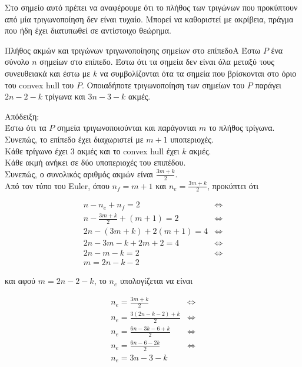 \documentclass[oneside,12pt]{book}
\theoremstyle{definition}
\begin{document}
Στο σημείο αυτό πρέπει να αναφέρουμε ότι το πλήθος των τριγώνων που προκύπτουν από μία τριγωνοποίηση δεν είναι τυχαίο. Μπορεί να καθοριστεί με ακρίβεια, πράγμα που ήδη έχει διατυπωθεί σε αντίστοιχο θεώρημα. \\

\begin{mytheorem}{Πλήθος ακμών και τριγώνων τριγωνοποίησης σημείων στο επίπεδο}{Α}
	Έστω \(P\) ένα σύνολο \(n\) σημείων στο επίπεδο. Έστω ότι τα σημεία δεν είναι όλα μεταξύ τους συνευθειακά και έστω με \(k\) να συμβολίζονται ότα τα σημεία που βρίσκονται στο όριο του convex hull του \(P\). Οποιαδήποτε τριγωνοποίηση των σημείων του \(P\) παράγει \(2n - 2 - k \) τρίγωνα και \(3n - 3 - k\) ακμές.
\end{mytheorem}

Απόδειξη: \\
Έστω ότι τα \(P\) σημεία τριγωνοποιούνται και παράγονται \(m\) το πλήθος τρίγωνα. Συνεπώς, το επίπεδο έχει διαχωριστεί με \(m + 1\) υποπεριοχές. \\
Κάθε τρίγωνο έχει 3 ακμές και το convex hull έχει \(k\) ακμές. \\
Κάθε ακμή ανήκει σε δύο υποπεριοχές του επιπέδου. \\
Συνεπώς, ο συνολικός αριθμός ακμών είναι  \(\frac{3m + k}{2}\). \\
Από τον τύπο του Euler, όπου \(n_f = m + 1\) και \(n_e = \frac{3m + k}{2}\), προκύπτει ότι

\begin{align*}
	n - n_e + n_f= 2 & \Leftrightarrow \\
	n - \frac{3m + k}{2} + (m+1) = 2 & \Leftrightarrow \\
	2n - (3m + k) + 2(m+1) = 4 & \Leftrightarrow \\
	2n - 3m - k + 2m + 2 = 4 & \Leftrightarrow \\
	2n - m - k = 2 & \Leftrightarrow \\
	m = 2n - k - 2
\end{align*}

και αφού \(m = 2n - 2 - k\), το \(n_e\) υπολογίζεται να είναι

\begin{align*}
	n_e = \frac{3m + k}{2} & \Leftrightarrow \\
	n_e = \frac{3(2n - k - 2) + k}{2} & \Leftrightarrow \\
	n_e = \frac{6n - 3k - 6 + k}{2} & \Leftrightarrow \\
	n_e = \frac{6n - 6 - 2k}{2} & \Leftrightarrow \\
	n_e = 3n - 3 - k
\end{align*}
\end{document}
